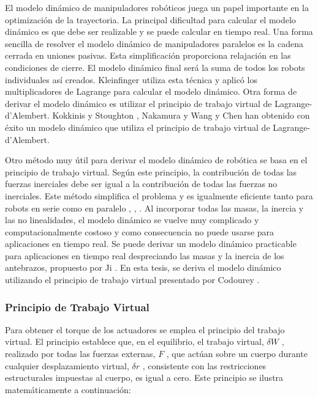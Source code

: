         El modelo dinámico de manipuladores robóticos juega un papel importante en la optimización de la trayectoria. La principal dificultad para calcular el modelo dinámico es que debe ser realizable y se puede calcular en tiempo real. Una forma sencilla de resolver el modelo dinámico de manipuladores paralelos es la cadena cerrada en uniones pasivas. Esta simplificación proporciona relajación en las condiciones de cierre. El modelo dinámico final será la suma de todos los robots individuales así creados. Kleinfinger \cite{kleinfinger1986modelisation} utiliza esta técnica y aplicó los multiplicadores de Lagrange para calcular el modelo dinámico. Otra forma de derivar el modelo dinámico es utilizar el principio de trabajo virtual de Lagrange-d’Alembert. Kokkinis y Stoughton \cite{kokkinis1991dynamics}, Nakamura \cite{NakamuraYoshihiko1991Ar} y Wang y Chen \cite{wang1994dynamic} han obtenido con éxito un modelo dinámico que utiliza el principio de trabajo virtual de Lagrange-d’Alembert.
        
        Otro método muy útil para derivar el modelo dinámico de robótica se basa en el principio de trabajo virtual. Según este principio, la contribución de todas las fuerzas inerciales debe ser igual a la contribución de todas las fuerzas no inerciales. Este método simplifica el problema y es igualmente eficiente tanto para robots en serie como en paralelo \cite{Codourey:31400}, \cite{bodyoriente}, \cite{zhang1993efficient}. Al incorporar todas las masas, la inercia y las no linealidades, el modelo dinámico se vuelve muy complicado y computacionalmente costoso y como consecuencia no puede usarse para aplicaciones en tiempo real. Se puede derivar un modelo dinámico practicable para aplicaciones en tiempo real despreciando las masas y la inercia de los antebrazos, propuesto por Ji \cite{StudyinertiaStewart}. En esta tesis, se deriva el modelo dinámico utilizando el principio de trabajo virtual presentado por Codourey \cite{Codourey_decoupling}.      
        \newpage


        \subsubsection{Principio de Trabajo Virtual}

        Para obtener el torque de los actuadores se emplea el principio del trabajo virtual. El principio establece que, en el equilibrio, el trabajo virtual,  $\delta W$  , realizado por todas las fuerzas externas, $F$ , que actúan sobre un cuerpo durante cualquier desplazamiento virtual,  $\delta r $  , consistente con las restricciones estructurales impuestas al cuerpo, es igual a cero. Este principio se ilustra matemáticamente a continuación:
        
